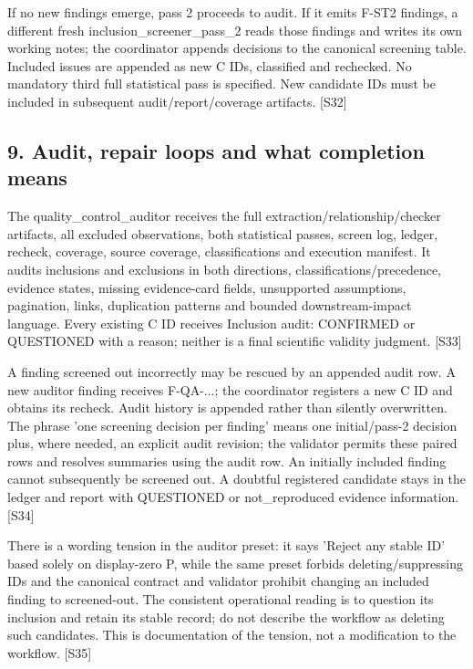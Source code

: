 \documentclass[10pt,a4paper]{article}
\begin{document}
If no new findings emerge, pass 2 proceeds to audit.\allowbreak{} If it emits F-\allowbreak{}ST2 findings, a different fresh inclusion\_\allowbreak{}screener\_\allowbreak{}pass\_\allowbreak{}2 reads those findings and writes its own working notes; the coordinator appends decisions to the canonical screening table.\allowbreak{} Included issues are appended as new C IDs, classified and rechecked.\allowbreak{} No mandatory third full statistical pass is specified.\allowbreak{} New candidate IDs must be included in subsequent audit/\allowbreak{}report/\allowbreak{}coverage artifacts.\allowbreak{} [S32]\par
\subsection*{9.\allowbreak{} Audit, repair loops and what completion means}
The quality\_\allowbreak{}control\_\allowbreak{}auditor receives the full extraction/\allowbreak{}relationship/\allowbreak{}checker artifacts, all excluded observations, both statistical passes, screen log, ledger, recheck, coverage, source coverage, classifications and execution manifest.\allowbreak{} It audits inclusions and exclusions in both directions, classifications/\allowbreak{}precedence, evidence states, missing evidence-\allowbreak{}card fields, unsupported assumptions, pagination, links, duplication patterns and bounded downstream-\allowbreak{}impact language.\allowbreak{} Every existing C ID receives Inclusion audit: CONFIRMED or QUESTIONED with a reason; neither is a final scientific validity judgment.\allowbreak{} [S33]\par
A finding screened out incorrectly may be rescued by an appended audit row.\allowbreak{} A new auditor finding receives F-\allowbreak{}QA-\allowbreak{}.\allowbreak{}.\allowbreak{}.\allowbreak{}; the coordinator registers a new C ID and obtains its recheck.\allowbreak{} Audit history is appended rather than silently overwritten.\allowbreak{} The phrase 'one screening decision per finding' means one initial/\allowbreak{}pass-\allowbreak{}2 decision plus, where needed, an explicit audit revision; the validator permits these paired rows and resolves summaries using the audit row.\allowbreak{} An initially included finding cannot subsequently be screened out.\allowbreak{} A doubtful registered candidate stays in the ledger and report with QUESTIONED or not\_\allowbreak{}reproduced evidence information.\allowbreak{} [S34]\par
There is a wording tension in the auditor preset: it says 'Reject any stable ID' based solely on display-\allowbreak{}zero P, while the same preset forbids deleting/\allowbreak{}suppressing IDs and the canonical contract and validator prohibit changing an included finding to screened-\allowbreak{}out.\allowbreak{} The consistent operational reading is to question its inclusion and retain its stable record; do not describe the workflow as deleting such candidates.\allowbreak{} This is documentation of the tension, not a modification to the workflow.\allowbreak{} [S35]\par
\end{document}
